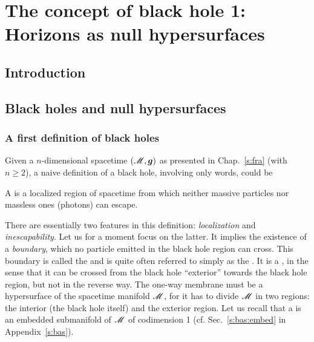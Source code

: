 \chapter{The concept of black hole 1: Horizons as null hypersurfaces}
\label{s:def}

\minitoc

\section{Introduction}



\section{Black holes and null hypersurfaces}

\subsection{A first definition of black holes} \label{s:def:first_defin}

Given a $n$-dimensional spacetime $(\mathscr{M},\bm{g})$ as presented in Chap.~\ref{s:fra}
(with $n\geq 2$),
a naive definition of a black hole, involving only words, could be
\begin{greybox}
A  is a localized region of spacetime
from which neither massive particles nor massless ones (photons) can escape.
\end{greybox}
There are essentially two features in this definition: \emph{localization}
and \emph{inescapability}. Let us for a moment focus on the latter.
It implies the existence of a \emph{boundary}, which no
particle emitted in the black hole region can cross.
This boundary is called the
 and is
quite often referred to simply as the .
It is a ,
in the sense that it can be crossed from the black hole ``exterior'' towards
the black hole region, but not in the reverse way. The one-way membrane must be
a hypersurface of the spacetime manifold $\mathscr{M}$, for it has to divide $\mathscr{M}$ in two regions:
the interior (the black hole itself) and the exterior region.
Let us recall that a  is an
embedded submanifold of $\mathscr{M}$ of codimension 1
(cf. Sec.~\ref{s:bas:embed} in Appendix~\ref{s:bas}).


